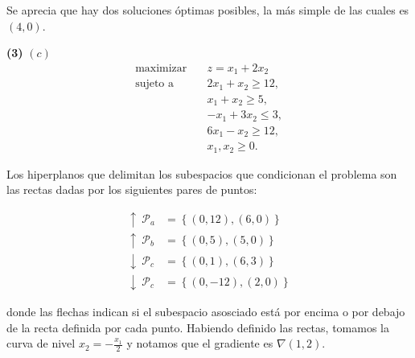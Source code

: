\documentclass[12pt]{article}
\begin{document}
Se aprecia que hay dos soluciones óptimas posibles, la más simple de las cuales
es $(4, 0)$. 


\pagebreak 

\begin{myframe}

    \textbf{(3)} $(c)$
\[
\begin{aligned}
\text{maximizar} \quad & z = x_1 + 2x_2 \\
\text{sujeto a} \quad
& 2x_1 + x_2 \geq 12, \\
& x_1 + x_2 \geq 5, \\
& -x_1 + 3x_2 \leq 3, \\
& 6x_1 - x_2 \geq 12, \\
& x_1, x_2 \geq 0.
\end{aligned}
\]
\end{myframe}

Los hiperplanos que delimitan los subespacios que condicionan el problema son
las rectas dadas por los siguientes pares de puntos:

\begin{align*}
    \uparrow ~ \mathcal{P}_a &= \left\{ (0, 12), (6, 0) \right\} \\ 
    \uparrow ~ \mathcal{P}_b &= \left\{ (0, 5), (5, 0) \right\} \\ 
    \downarrow ~ \mathcal{P}_c &= \left\{ (0, 1), (6, 3) \right\} \\ 
    \downarrow ~ \mathcal{P}_c &= \left\{ (0, -12), (2, 0) \right\} 
\end{align*}

donde las flechas indican si el subespacio asosciado está por encima o por
debajo de la recta definida por cada punto. Habiendo definido las rectas,
tomamos la curva de nivel $x_2 = -\frac{x_1}{2}$ y notamos que el gradiente es 
$\nabla (1, 2)$.
\end{document}
